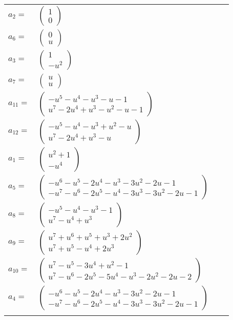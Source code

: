 \documentclass[1p]{elsarticle_modified}
\theoremstyle{definition}
\begin{document}
\begin{tabular}{m{7pt} m{180pt} m{7pt} m{180pt} }
\flushright $a_{2}=$&$\begin{pmatrix}1\\0\end{pmatrix}$ \\
\flushright $a_{6}=$&$\begin{pmatrix}0\\u\end{pmatrix}$ \\
\flushright $a_{3}=$&$\begin{pmatrix}1\\- u^2\end{pmatrix}$ \\
\flushright $a_{7}=$&$\begin{pmatrix}u\\u\end{pmatrix}$ \\
\flushright $a_{11}=$&$\begin{pmatrix}- u^5- u^4- u^3- u-1\\u^7-2 u^4+u^3- u^2- u-1\end{pmatrix}$ \\
\flushright $a_{12}=$&$\begin{pmatrix}- u^5- u^4- u^3+u^2- u\\u^7-2 u^4+u^3- u\end{pmatrix}$ \\
\flushright $a_{1}=$&$\begin{pmatrix}u^2+1\\- u^4\end{pmatrix}$ \\
\flushright $a_{5}=$&$\begin{pmatrix}- u^6- u^5-2 u^4- u^3-3 u^2-2 u-1\\- u^7- u^6-2 u^5- u^4-3 u^3-3 u^2-2 u-1\end{pmatrix}$ \\
\flushright $a_{8}=$&$\begin{pmatrix}- u^5- u^4- u^3-1\\u^7- u^4+u^3\end{pmatrix}$ \\
\flushright $a_{9}=$&$\begin{pmatrix}u^7+u^6+u^5+u^3+2 u^2\\u^7+u^5- u^4+2 u^3\end{pmatrix}$ \\
\flushright $a_{10}=$&$\begin{pmatrix}u^7- u^5-3 u^4+u^2-1\\u^7- u^6-2 u^5-5 u^4- u^3-2 u^2-2 u-2\end{pmatrix}$ \\
\flushright $a_{4}=$&$\begin{pmatrix}- u^6- u^5-2 u^4- u^3-3 u^2-2 u-1\\- u^7- u^6-2 u^5- u^4-3 u^3-3 u^2-2 u-1\end{pmatrix}$\\&\end{tabular}
\end{document}
